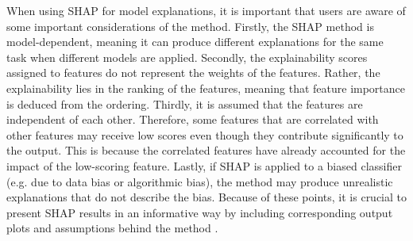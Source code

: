When using SHAP for model explanations, it is important that users are aware of some important considerations of the method. Firstly, the SHAP method is model-dependent, meaning it can produce different explanations for the same task when different models are applied. Secondly, the explainability scores assigned to features do not represent the weights of the features. Rather, the explainability lies in the ranking of the features, meaning that feature importance is deduced from the ordering. Thirdly, it is assumed that the features are independent of each other. Therefore, some features that are correlated with other features may receive low scores even though they contribute significantly to the output. This is because the correlated features have already accounted for the impact of the low-scoring feature. Lastly, if SHAP is applied to a biased classifier (e.g. due to data bias or algorithmic bias), the method may produce unrealistic explanations that do not describe the bias. Because of these points, it is crucial to present SHAP results in an informative way by including corresponding output plots and assumptions behind the method \cite{salih_perspective_2025}.

